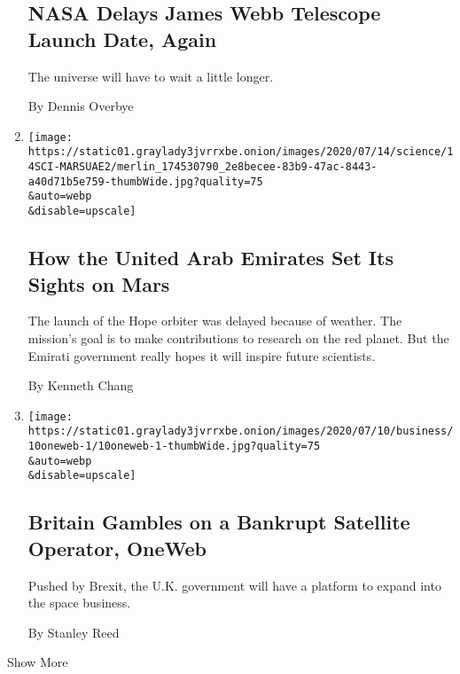 \begin{enumerate}
  \hypertarget{nasa-delays-james-webb-telescope-launch-date-again}{%
  \subsection{NASA Delays James Webb Telescope Launch Date,
  Again}\label{nasa-delays-james-webb-telescope-launch-date-again}}

  The universe will have to wait a little longer.

  By Dennis Overbye
\item
  \href{/2020/07/14/science/mars-united-arab-emirates.html}{}

  \texttt{[image: https://static01.graylady3jvrrxbe.onion/images/2020/07/14/science/14SCI-MARSUAE2/merlin\_174530790\_2e8becee-83b9-47ac-8443-a40d71b5e759-thumbWide.jpg?quality=75\\\&auto=webp\\\&disable=upscale]}

  \hypertarget{how-the-united-arab-emirates-set-its-sights-on-mars}{%
  \subsection{How the United Arab Emirates Set Its Sights on
  Mars}\label{how-the-united-arab-emirates-set-its-sights-on-mars}}

  The launch of the Hope orbiter was delayed because of weather. The
  mission's goal is to make contributions to research on the red planet.
  But the Emirati government really hopes it will inspire future
  scientists.

  By Kenneth Chang
\item
  \href{/2020/07/10/business/britain-oneweb.html}{}

  \texttt{[image: https://static01.graylady3jvrrxbe.onion/images/2020/07/10/business/10oneweb-1/10oneweb-1-thumbWide.jpg?quality=75\\\&auto=webp\\\&disable=upscale]}

  \hypertarget{britain-gambles-on-a-bankrupt-satellite-operator-oneweb}{%
  \subsection{Britain Gambles on a Bankrupt Satellite Operator,
  OneWeb}\label{britain-gambles-on-a-bankrupt-satellite-operator-oneweb}}

  Pushed by Brexit, the U.K. government will have a platform to expand
  into the space business.

  By Stanley Reed
\end{enumerate}

Show More

